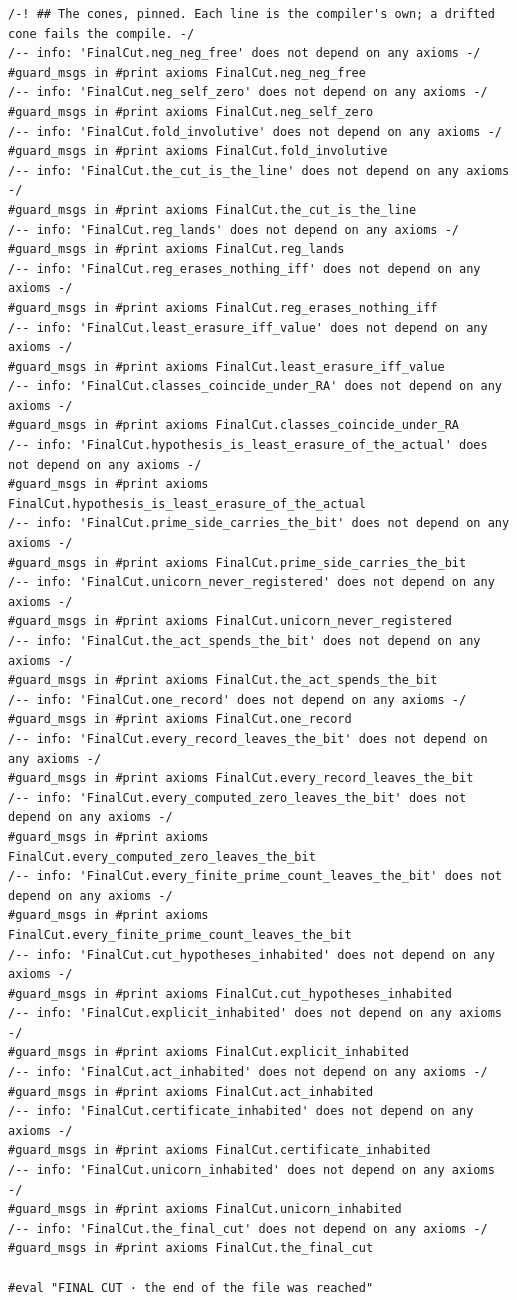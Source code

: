\documentclass[10pt,twocolumn]{article}
\begin{document}
\begin{Verbatim}
/-! ## The cones, pinned. Each line is the compiler's own; a drifted cone fails the compile. -/
/-- info: 'FinalCut.neg_neg_free' does not depend on any axioms -/
#guard_msgs in #print axioms FinalCut.neg_neg_free
/-- info: 'FinalCut.neg_self_zero' does not depend on any axioms -/
#guard_msgs in #print axioms FinalCut.neg_self_zero
/-- info: 'FinalCut.fold_involutive' does not depend on any axioms -/
#guard_msgs in #print axioms FinalCut.fold_involutive
/-- info: 'FinalCut.the_cut_is_the_line' does not depend on any axioms -/
#guard_msgs in #print axioms FinalCut.the_cut_is_the_line
/-- info: 'FinalCut.reg_lands' does not depend on any axioms -/
#guard_msgs in #print axioms FinalCut.reg_lands
/-- info: 'FinalCut.reg_erases_nothing_iff' does not depend on any axioms -/
#guard_msgs in #print axioms FinalCut.reg_erases_nothing_iff
/-- info: 'FinalCut.least_erasure_iff_value' does not depend on any axioms -/
#guard_msgs in #print axioms FinalCut.least_erasure_iff_value
/-- info: 'FinalCut.classes_coincide_under_RA' does not depend on any axioms -/
#guard_msgs in #print axioms FinalCut.classes_coincide_under_RA
/-- info: 'FinalCut.hypothesis_is_least_erasure_of_the_actual' does not depend on any axioms -/
#guard_msgs in #print axioms FinalCut.hypothesis_is_least_erasure_of_the_actual
/-- info: 'FinalCut.prime_side_carries_the_bit' does not depend on any axioms -/
#guard_msgs in #print axioms FinalCut.prime_side_carries_the_bit
/-- info: 'FinalCut.unicorn_never_registered' does not depend on any axioms -/
#guard_msgs in #print axioms FinalCut.unicorn_never_registered
/-- info: 'FinalCut.the_act_spends_the_bit' does not depend on any axioms -/
#guard_msgs in #print axioms FinalCut.the_act_spends_the_bit
/-- info: 'FinalCut.one_record' does not depend on any axioms -/
#guard_msgs in #print axioms FinalCut.one_record
/-- info: 'FinalCut.every_record_leaves_the_bit' does not depend on any axioms -/
#guard_msgs in #print axioms FinalCut.every_record_leaves_the_bit
/-- info: 'FinalCut.every_computed_zero_leaves_the_bit' does not depend on any axioms -/
#guard_msgs in #print axioms FinalCut.every_computed_zero_leaves_the_bit
/-- info: 'FinalCut.every_finite_prime_count_leaves_the_bit' does not depend on any axioms -/
#guard_msgs in #print axioms FinalCut.every_finite_prime_count_leaves_the_bit
/-- info: 'FinalCut.cut_hypotheses_inhabited' does not depend on any axioms -/
#guard_msgs in #print axioms FinalCut.cut_hypotheses_inhabited
/-- info: 'FinalCut.explicit_inhabited' does not depend on any axioms -/
#guard_msgs in #print axioms FinalCut.explicit_inhabited
/-- info: 'FinalCut.act_inhabited' does not depend on any axioms -/
#guard_msgs in #print axioms FinalCut.act_inhabited
/-- info: 'FinalCut.certificate_inhabited' does not depend on any axioms -/
#guard_msgs in #print axioms FinalCut.certificate_inhabited
/-- info: 'FinalCut.unicorn_inhabited' does not depend on any axioms -/
#guard_msgs in #print axioms FinalCut.unicorn_inhabited
/-- info: 'FinalCut.the_final_cut' does not depend on any axioms -/
#guard_msgs in #print axioms FinalCut.the_final_cut

#eval "FINAL CUT · the end of the file was reached"
\end{Verbatim}
\end{document}
